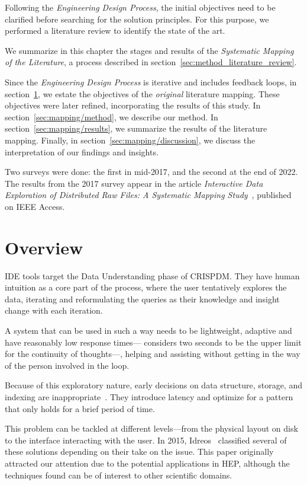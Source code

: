 
Following the \emph{Engineering Design Process}, the initial objectives
need to be clarified before searching for the solution principles.
For this purpose, we performed a literature review to identify the
state of the art.

We summarize in this chapter the stages and results of the
\emph{Systematic Mapping of the Literature}, a process described in section~\ref{sec:method_literature_review}.

Since the \emph{Engineering Design Process} is iterative and includes feedback loops, in
section~\ref{sec:mapping/overview}, we estate the objectives of the
\emph{original} literature mapping. These objectives were later refined,
incorporating the results of this study.
In section~\ref{sec:mapping/method}, we describe our method.
In section~\ref{sec:mapping/results}, we summarize the results of the literature mapping.
Finally, in section~\ref{sec:mapping/discussion}, we discuss the interpretation of our findings
and insights.

Two surveys were done: the first in mid-2017, and the second at the end of 2022.
The results from the 2017 survey appear in the
article \emph{Interactive Data Exploration of Distributed Raw Files: A Systematic Mapping Study}~\cite{Alvarez2019},
published on IEEE Access.

\section{Overview}
\label{sec:mapping/overview}
\gls{IDE} tools target the Data Understanding phase of \gls{CRISPDM}. They have
human intuition as a core part of the process, where the user tentatively
explores the data, iterating and reformulating the queries as
their knowledge and insight change with each iteration.

A system that can be used in such a way needs to be lightweight, adaptive
and have reasonably low response times---\cite{Miller1968} considers two seconds
to be the upper limit for the continuity of thoughts---,
helping and assisting without getting in the way of the person involved in
the loop.

Because of this exploratory nature, early decisions on data structure,
storage, and indexing are inappropriate~\cite{Kersten2011}. They introduce latency
and optimize for a pattern that only holds for a brief period of time.

This problem can be tackled at different levels---from the physical layout on disk
to the interface interacting with the user. In 2015, Idreos~\cite{Idreos2015}
classified several of these solutions depending on their take
on the issue. This paper originally attracted our attention  due to the potential
applications in \gls{HEP}\footnotemark, although
the techniques found can be of interest to other scientific domains.

